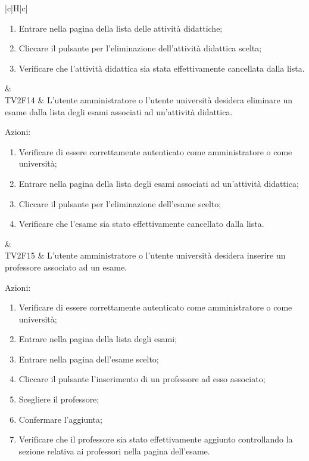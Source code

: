 \begin{longtable}{|c|H|c|}
\begin{enumerate}
			\item Entrare nella pagina della lista delle attività didattiche;
			\item Cliccare il pulsante per l'eliminazione dell'attività didattica scelta;
			\item Verificare che l'attività didattica sia stata effettivamente cancellata dalla lista.
		\end{enumerate} & \Ts \\
		\hline
		TV2F14 & L'utente amministratore o l'utente università desidera eliminare un esame dalla lista degli esami associati ad un'attività didattica. \newline \begin{flushleft}
			Azioni:\newline
		\end{flushleft}
		\begin{enumerate}
			\item Verificare di essere correttamente autenticato come amministratore o come università;
			\item Entrare nella pagina della lista degli esami associati ad un'attività didattica;
			\item Cliccare il pulsante per l'eliminazione dell'esame scelto;
			\item Verificare che l'esame sia stato effettivamente cancellato dalla lista.
		\end{enumerate} & \Ts \\
		\hline
		TV2F15 & L'utente amministratore o l'utente università desidera inserire un professore associato ad un esame. \newline \begin{flushleft}
			Azioni:\newline
		\end{flushleft}
		\begin{enumerate}
			\item Verificare di essere correttamente autenticato come amministratore o come università;
			\item Entrare nella pagina della lista degli esami;
			\item Entrare nella pagina dell'esame scelto;
			\item Cliccare il pulsante l'inserimento di un professore ad esso associato;
			\item Scegliere il professore;
			\item Confermare l'aggiunta;
			\item Verificare che il professore sia stato effettivamente aggiunto controllando la sezione relativa ai professori nella pagina dell'esame.

\end{enumerate}
\end{longtable}
